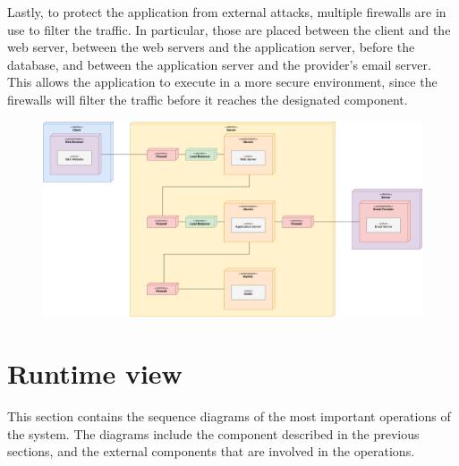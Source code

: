 Lastly, to protect the application from external attacks, multiple firewalls are in use to filter the traffic.
In particular, those are placed between the client and the web server, between the web servers and the application server, before the database, and between the application server and the provider's email server.
This allows the application to execute in a more secure environment, since the firewalls will filter the traffic before it reaches the designated component.

\begin{figure}[H]
    \centering
    \includegraphics[width=0.8\linewidth]{../assets/deployment-diagrams/deployment-diagram.png}
\end{figure}

\section{Runtime view}

This section contains the sequence diagrams of the most important operations of the system.
The diagrams include the component described in the previous sections, and the external components that are involved in the operations.

